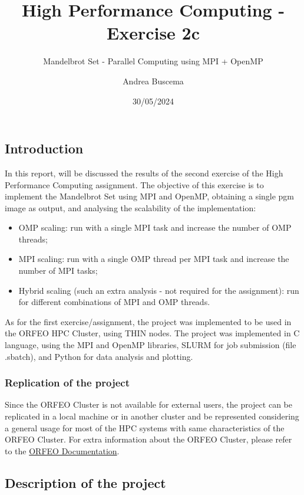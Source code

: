 \documentclass[
]{article}
\title{High Performance Computing - Exercise 2c}
\subtitle{Mandelbrot Set - Parallel Computing using MPI + OpenMP}
\author{Andrea Buscema}
\date{30/05/2024}
\providecommand{\tightlist}{%
  \setlength{\itemsep}{0pt}\setlength{\parskip}{0pt}}
\begin{document}
\maketitle

\subsection{Introduction}\label{introduction}

In this report, will be discussed the results of the second exercise of
the High Performance Computing assignment. The objective of this
exercise is to implement the Mandelbrot Set using MPI and OpenMP,
obtaining a single pgm image as output, and analysing the scalability of
the implementation:

\begin{itemize}
\tightlist
\item
  OMP scaling: run with a single MPI task and increase the number of OMP
  threads;
\item
  MPI scaling: run with a single OMP thread per MPI task and increase
  the number of MPI tasks;
\item
  Hybrid scaling (such an extra analysis - not required for the
  assignment): run for different combinations of MPI and OMP threads.
\end{itemize}

As for the first exercise/assignment, the project was implemented to be
used in the ORFEO HPC Cluster, using THIN nodes. The project was
implemented in C language, using the MPI and OpenMP libraries, SLURM for
job submission (file .sbatch), and Python for data analysis and
plotting.

\subsubsection{Replication of the
project}\label{replication-of-the-project}

Since the ORFEO Cluster is not available for external users, the project
can be replicated in a local machine or in another cluster and be
represented considering a general usage for most of the HPC systems with
same characteristics of the ORFEO Cluster. For extra information about
the ORFEO Cluster, please refer to the
\href{https://orfeo-doc.areasciencepark.it/HPC/}{ORFEO Documentation}.

\subsection{Description of the
project}\label{description-of-the-project}
\end{document}
